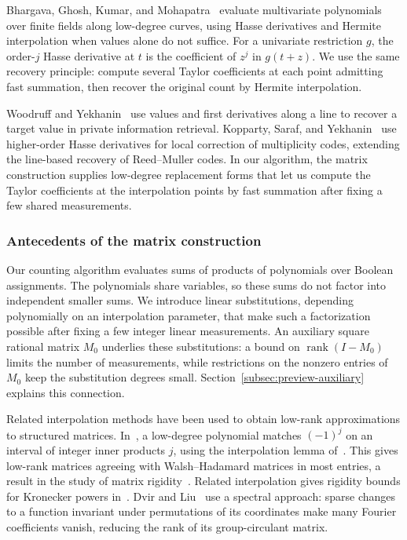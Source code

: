 \documentclass[11pt,reqno]{amsart}
\numberwithin{equation}{section}
\theoremstyle{definition}\newtheorem{definition}[theorem]{Definition}
\theoremstyle{remark}\newtheorem{remark}[theorem]{Remark}
\begin{document}
Bhargava, Ghosh, Kumar, and
Mohapatra~\cite[Sections~3.1--3.2]{BGKM23} evaluate multivariate
polynomials over finite fields along low-degree curves, using
Hasse derivatives and Hermite interpolation when values alone do not
suffice. For a univariate restriction $g$, the order-$j$
Hasse derivative at $t$ is the coefficient of $z^j$ in $g(t+z)$. We use the same recovery principle: compute several Taylor
coefficients at each point admitting fast summation, then recover
the original count by Hermite interpolation.

Woodruff and Yekhanin~\cite{WY07} use values and first derivatives
along a line to recover a target value in private information retrieval.
Kopparty, Saraf, and Yekhanin~\cite{KSY14} use higher-order
Hasse derivatives for local correction of multiplicity codes, extending the
line-based recovery of Reed--Muller codes. In our algorithm, the
matrix construction supplies low-degree replacement forms that let us
compute the Taylor coefficients at the interpolation points by fast
summation after fixing a few shared measurements.

\subsubsection{Antecedents of the matrix construction}\label{subsec:related-spectral}
Our counting algorithm evaluates sums of products of polynomials over
Boolean assignments. The polynomials share variables, so these sums
do not factor into independent smaller sums. We introduce linear
substitutions, depending polynomially on an interpolation parameter,
that make such a factorization possible after fixing a few integer
linear measurements. An auxiliary square rational matrix $M_0$
underlies these substitutions: a bound on $\operatorname{rank}(I-M_0)$
limits the number of measurements, while restrictions on the nonzero
entries of $M_0$ keep the substitution degrees small.
Section~\ref{subsec:preview-auxiliary} explains this connection.

Related interpolation methods have been used to obtain low-rank
approximations to structured matrices. In~\cite[Section~3]{AW17},
a low-degree polynomial matches $(-1)^j$ on an interval of integer
inner products $j$, using the interpolation lemma
of~\cite[Lemma~3.1]{AW15}. This gives low-rank matrices agreeing with
Walsh--Hadamard matrices in most entries, a result in the study of
matrix rigidity~\cite{Val77}. Related interpolation gives rigidity
bounds for Kronecker powers in~\cite[Theorem~6.1]{AGP23}.
Dvir and Liu~\cite[Claim~2.20 and Lemmas~3.3--3.4]{DL20} use a spectral approach:
sparse changes to a function invariant under permutations of its coordinates make many Fourier coefficients vanish,
reducing the rank of its group-circulant matrix.
\end{document}
